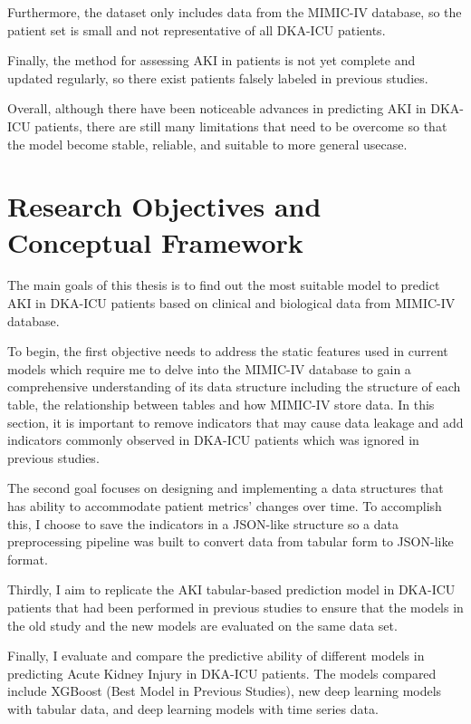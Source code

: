 \documentclass[../main.tex]{subfiles}
\begin{document}
Furthermore, the dataset only includes data from the MIMIC-IV database, so the patient set is small and not representative of all DKA-ICU patients.

Finally, the method for assessing AKI in patients is not yet complete and updated regularly, so there exist patients falsely labeled in previous studies.

Overall, although there have been noticeable advances in predicting AKI in DKA-ICU patients, there are still many limitations that need to be overcome so that the model become stable, reliable, and suitable to more general usecase.



\section{Research Objectives and Conceptual Framework}

The main goals of this thesis is to find out the most suitable model to predict AKI in DKA-ICU patients based on clinical and biological data from MIMIC-IV database.

To begin, the first objective needs to address the static features used  in current models which require me to delve into the MIMIC-IV database to gain a comprehensive understanding of its data structure including the structure of each table, the relationship between tables and how MIMIC-IV store data.
In this section, it is important to remove indicators that may cause data leakage and add indicators commonly observed in DKA-ICU patients which was ignored in previous studies.

The second goal focuses on designing and implementing a data structures that has ability to accommodate patient metrics' changes over time.
To accomplish this, I choose to save the indicators in a JSON-like structure so a data preprocessing pipeline was built to convert data from tabular form to JSON-like format.

Thirdly, I aim to replicate the AKI tabular-based prediction model in DKA-ICU patients that had been performed in previous studies to ensure that the models in the old study and the new models are evaluated on the same data set.

Finally, I evaluate and compare the predictive ability of different models in predicting Acute Kidney Injury in DKA-ICU patients.
The models compared include XGBoost (Best Model in Previous Studies), new deep learning models with tabular data, and deep learning models with time series data.
\end{document}
